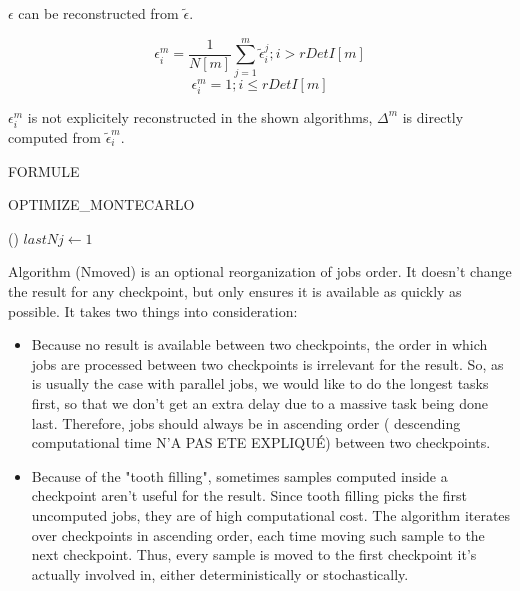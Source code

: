 $\epsilon$ can be reconstructed from $\tilde \epsilon$.



$$\epsilon^m_i = \frac{1}{N[m]} \sum_{j=1}^{m} {\tilde \epsilon^j_i} ; i > rDetI[m]$$
$$\epsilon^m_i = 1; i \leq rDetI[m]$$


$\epsilon^m_i$ is not explicitely reconstructed in the shown algorithms, $\Delta^m$ is directly computed from $\tilde \epsilon^m_i$.

FORMULE


\begin{algorithm}
	\caption{OPTIMIZE\_MONTECARLO}
	\label{OPTIMIZE_MONTECARLO}
	
	
	\Fn(){}{
		$lastNj \gets 1$ \;
	}
\end{algorithm}

Algorithm (Nmoved) is an optional reorganization of jobs order. It doesn't change the result for any checkpoint, but only ensures it is available as quickly as possible. It takes two things into consideration:
\begin{itemize}
\item
Because no result is available between two checkpoints, the order in which jobs are processed between two checkpoints is irrelevant for the result. So, as is usually the case with parallel jobs, we would like to do the longest tasks first, so that we don't get an extra delay due to a massive task being done last. Therefore, jobs should always be in ascending order ( descending computational time N'A PAS ETE EXPLIQUÉ) between two checkpoints.
\item
Because of the "tooth filling", sometimes samples computed inside a checkpoint aren't useful for the result. Since tooth filling picks the first uncomputed jobs, they are of high computational cost. The algorithm iterates over checkpoints in ascending order, each time moving such sample to the next checkpoint. Thus, every sample is moved to the first checkpoint it's actually involved in, either deterministically or stochastically.
\end{itemize}



